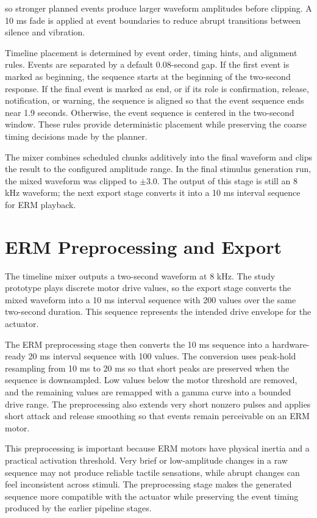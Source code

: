 so stronger planned events produce larger waveform amplitudes before clipping. A 10 ms fade is applied at event boundaries to reduce abrupt transitions between silence and vibration.

Timeline placement is determined by event order, timing hints, and alignment rules. Events are separated by a default 0.08-second gap. If the first event is marked as beginning, the sequence starts at the beginning of the two-second response. If the final event is marked as end, or if its role is confirmation, release, notification, or warning, the sequence is aligned so that the event sequence ends near 1.9 seconds. Otherwise, the event sequence is centered in the two-second window. These rules provide deterministic placement while preserving the coarse timing decisions made by the planner.

The mixer combines scheduled chunks additively into the final waveform and clips the result to the configured amplitude range. In the final stimulus generation run, the mixed waveform was clipped to $\pm 3.0$. The output of this stage is still an 8 kHz waveform; the next export stage converts it into a 10 ms interval sequence for ERM playback.

\section{ERM Preprocessing and Export}

The timeline mixer outputs a two-second waveform at 8 kHz. The study prototype plays discrete motor drive values, so the export stage converts the mixed waveform into a 10 ms interval sequence with 200 values over the same two-second duration. This sequence represents the intended drive envelope for the actuator.

The ERM preprocessing stage then converts the 10 ms sequence into a hardware-ready 20 ms interval sequence with 100 values. The conversion uses peak-hold resampling from 10 ms to 20 ms so that short peaks are preserved when the sequence is downsampled. Low values below the motor threshold are removed, and the remaining values are remapped with a gamma curve into a bounded drive range. The preprocessing also extends very short nonzero pulses and applies short attack and release smoothing so that events remain perceivable on an ERM motor.

This preprocessing is important because ERM motors have physical inertia and a practical activation threshold. Very brief or low-amplitude changes in a raw sequence may not produce reliable tactile sensations, while abrupt changes can feel inconsistent across stimuli. The preprocessing stage makes the generated sequence more compatible with the actuator while preserving the event timing produced by the earlier pipeline stages.

